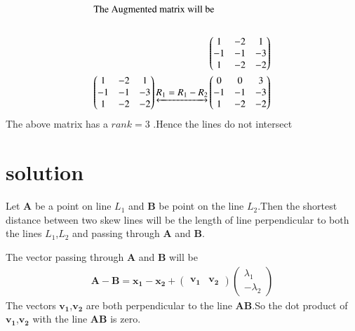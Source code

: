 \documentclass[journal,12pt,twocolumn]{IEEEtran}
\begin{document}
\begin{align}
    \intertext{The Augmented matrix will be}\\
    \begin{pmatrix}1 & -2 & 1\\-1 & -1 & -3\\1 & -2 & -2\end{pmatrix}\\
    \begin{pmatrix}1 & -2 & 1\\-1 & -1 & -3\\1 & -2 & -2\end{pmatrix}\underleftrightarrow{R_1=R_1-R_2}\begin{pmatrix}0 & 0 & 3\\-1 & -1 & -3\\1 & -2 & -2\end{pmatrix}
\end{align}
The above matrix has a $rank=3$ .Hence the lines do not intersect
\section{solution}
Let $\bm{A}$ be a point on line $L_1$ and $\bm{B}$ be point on the line $L_2$.Then the shortest distance between two skew lines will be the length of line perpendicular to both the lines $L_1$,$L_2$ and passing through $\bm{A}$ and $\bm{B}$.\par
\vspace{5mm}
The vector passing through $\bm{A}$ and $\bm{B}$ will be \\
\begin{align}
    \bm{A-B}=\bm{x_1-x_2}+\begin{pmatrix}\bm{v_1} & \bm{v_2}\end{pmatrix}\begin{pmatrix}\lambda_1\\-\lambda_2\end{pmatrix}
\end{align}
The vectors $\bm{v_1}$,$\bm{v_2}$ are both perpendicular to the line $\bm{AB}$.So the dot product of $\bm{v_1}$,$\bm{v_2}$ with the line $\bm{AB}$ is zero.\\
\end{document}
